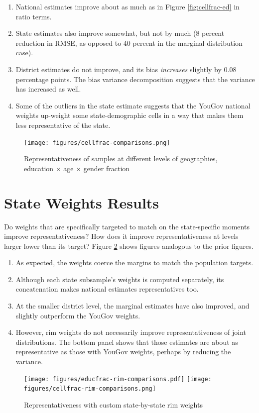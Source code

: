 \documentclass[11pt]{article}
\begin{document}
\smallskip 
\begin{enumerate}
\item National estimates improve about as much as in Figure \ref{fig:cellfrac-ed} in ratio terms.
\item State estimates also improve somewhat, but not by much (8 percent reduction in RMSE, as opposed to 40 percent in the marginal distribution case).
\item District estimates do not improve, and its bias \emph{increases} slightly by 0.08 percentage points. The bias variance decomposition suggests that the variance has increased as well.
\item Some of the outliers in the state estimate suggests that the YouGov national weights up-weight some state-demographic cells in a way that makes them less representative of the state. 
\end{enumerate}

\begin{figure}[bt!h]
\centering
\caption{Representativeness of samples at different levels of geographies, education \(\times\) age \(\times\) gender fraction \label{fig:cellfrac-ed-age-sex}}
\texttt{[image: figures/cellfrac-comparisons.png]}
\end{figure}

\FloatBarrier
\newpage

\section{State Weights Results \label{sec:res-state}}

Do weights that are specifically targeted to match on the state-specific moments improve representativeness? How does it improve representativeness at levels larger lower than its target? Figure \ref{fig:rim-comparisons} shows figures analogous to the prior figures.

\medskip

\begin{enumerate}
\item As expected, the weights coerce the margins to match the population targets.
\item Although each state subsample's weights is computed separately, its concatenation makes national estimates representatives too. 
\item At the smaller district level, the marginal estimates have also improved, and slightly outperform the YouGov weights.
\item However, rim weights do not necessarily improve representativeness of joint distributions. The bottom panel shows that those estimates are about as representative as those with YouGov weights, perhaps by reducing the variance.
\end{enumerate}
\begin{figure}[bt!h]
\centering
\caption{Representativeness with custom state-by-state rim weights \label{fig:rim-comparisons}}
\texttt{[image: figures/educfrac-rim-comparisons.pdf]}
\texttt{[image: figures/cellfrac-rim-comparisons.png]}
\end{figure}
\end{document}
